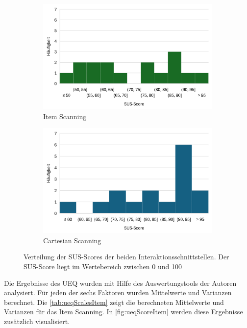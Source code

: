 \begin{figure}
    \centering
    \begin{subfigure} {.5\textwidth}
        \centering
        \includegraphics[width=0.99\linewidth]{images/Results/Histogramm-SUS-Item.png}
        \caption{Item Scanning}
        \label{fig:histoSUSItem}
       \end{subfigure}%
       \begin{subfigure}{.5\textwidth}
        \centering
       \includegraphics[width=.99\linewidth]{images/Results/Histogramm-SUS-Cartesian.png}
        \caption{Cartesian Scanning}
        \label{fig:histoSUSCartesian}
       \end{subfigure}
       \caption{Verteilung der SUS-Scores der beiden Interaktionsschnittstellen. Der SUS-Score liegt im Wertebereich zwischen 0 und 100 }
       \label{fig:histoSUS}
\end{figure}


Die Ergebnisse des UEQ wurden mit Hilfe des Auswertungstools der Autoren analysiert. Für jeden der sechs Faktoren wurden Mittelwerte und Varianzen berechnet. Die \autoref{tab:ueqScalesItem} zeigt die berechneten Mittelwerte und Varianzen für das Item Scanning. In \autoref{fig:ueqScoreItem} werden diese Ergebnisse zusätzlich visualisiert.

